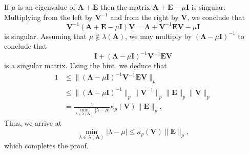 \documentclass{article}
\begin{document}
If $\mu$ is an eigenvalue of $\boldsymbol{A}+\boldsymbol{E}$ then the matrix $\boldsymbol{A}+\boldsymbol{E}-\mu \boldsymbol{I}$ is singular. Multiplying from the left by $\boldsymbol{V}^{-1}$ and from the right by $\boldsymbol{V}$, we conclude that
\[
\boldsymbol{V}^{-1}(\boldsymbol{A}+\boldsymbol{E}-\mu \boldsymbol{I})\boldsymbol{V} = \boldsymbol{\Lambda} + \boldsymbol{V}^{-1}\boldsymbol{E}\boldsymbol{V} - \mu \boldsymbol{I}
\]
is singular. Assuming that $\mu \notin \lambda(\boldsymbol{A})$, we may multiply by $(\boldsymbol{\Lambda}-\mu \boldsymbol{I})^{-1}$ to conclude that
\[
\boldsymbol{I} + (\boldsymbol{\Lambda}-\mu \boldsymbol{I})^{-1}\boldsymbol{V}^{-1}\boldsymbol{E}\boldsymbol{V}
\]
is a singular matrix. Using the hint, we deduce that
\begin{align*}
1 &\leq \|(\boldsymbol{\Lambda}-\mu \boldsymbol{I})^{-1}\boldsymbol{V}^{-1}\boldsymbol{E}\boldsymbol{V}\|_p \\
&\leq \|(\boldsymbol{\Lambda}-\mu \boldsymbol{I})^{-1}\|_p \|\boldsymbol{V}^{-1}\|_p \|\boldsymbol{E}\|_p \|\boldsymbol{V}\|_p \\
&= \frac{1}{\min_{\lambda \in \lambda(\boldsymbol{A})} |\lambda - \mu|} \kappa_p(\boldsymbol{V}) \|\boldsymbol{E}\|_p.
\end{align*}
Thus, we arrive at
\[
\min_{\lambda \in \lambda(\boldsymbol{A})}|\lambda - \mu| \leq \kappa_p(\boldsymbol{V}) \|\boldsymbol{E}\|_p,
\]
which completes the proof.
\end{document}
